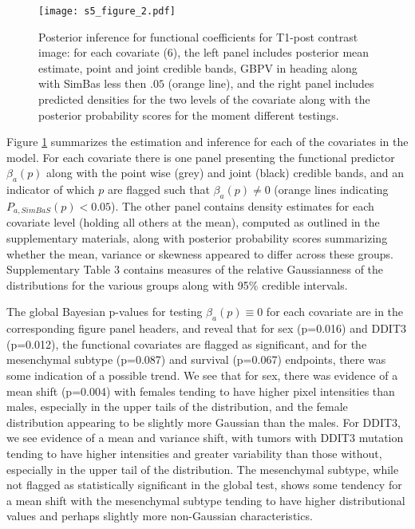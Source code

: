 \documentclass[11pt]{article}
\begin{document}
 \begin{figure}[!htb]
 \caption{Posterior inference for functional coefficients for T1-post contrast image:
for each covariate (6), the left panel includes posterior mean estimate, point and joint credible bands, GBPV in heading along with
SimBas less then $.05$ (orange line), 
 and the right panel includes predicted densities for the two levels of the covariate along with the posterior probability scores
   for the moment different testings.
     \label{S5_Figure_2}}
\centering
\texttt{[image: s5\_figure\_2.pdf]}
\end{figure}

Figure  \ref{S5_Figure_2} summarizes the estimation and inference for each of the covariates in the model.  For each covariate there is one panel presenting the functional predictor $\beta_a(p)$ along with the point wise (grey) and joint (black) credible bands, and an indicator of which $p$ are flagged such that $\beta_a(p)\ne 0$ (orange lines indicating $P_{a,SimBaS}(p)<0.05$).   The other panel contains density estimates for each covariate level (holding all others at the mean), computed as outlined in the supplementary materials,  along with posterior probability scores summarizing whether the mean, variance or skewness appeared to differ across these groups.  Supplementary Table %
3
contains measures of the relative Gaussianness of the distributions for the various groups along with 95\% credible intervals. 
  

The global Bayesian p-values for testing $\beta_a(p)\equiv0$ for each covariate are in the corresponding figure panel headers, and reveal that for sex (p=0.016) and DDIT3 (p=0.012), the functional covariates are flagged as significant, and for the mesenchymal subtype (p=0.087) and survival (p=0.067) endpoints, there was some indication of a possible trend.  We see that for sex, there was evidence of a mean shift (p=0.004) with females tending to have higher pixel intensities than males, especially in the upper tails of the distribution, and the female distribution appearing to be slightly more Gaussian than the males.  For DDIT3, we see evidence of a mean and variance shift, with tumors with DDIT3 mutation tending to have higher intensities and greater variability than those without, especially in the upper tail of the distribution.  The mesenchymal subtype, while not flagged as statistically significant in the global test, shows some tendency for a mean shift with the mesenchymal subtype tending to have higher distributional values and perhaps slightly more non-Gaussian characteristics.
\end{document}
